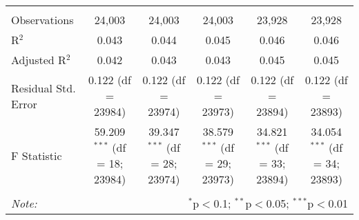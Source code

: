 \documentclass{article}
\begin{document}
\begin{table}[!htbp]
{\begin{tabular}{@{\extracolsep{5pt}}lccccc}
\hline \\[-1.8ex] 
Observations & 24,003 & 24,003 & 24,003 & 23,928 & 23,928 \\ 
R$^{2}$ & 0.043 & 0.044 & 0.045 & 0.046 & 0.046 \\ 
Adjusted R$^{2}$ & 0.042 & 0.043 & 0.043 & 0.045 & 0.045 \\ 
Residual Std. Error & 0.122 (df = 23984) & 0.122 (df = 23974) & 0.122 (df = 23973) & 0.122 (df = 23894) & 0.122 (df = 23893) \\ 
F Statistic & 59.209$^{***}$ (df = 18; 23984) & 39.347$^{***}$ (df = 28; 23974) & 38.579$^{***}$ (df = 29; 23973) & 34.821$^{***}$ (df = 33; 23894) & 34.054$^{***}$ (df = 34; 23893) \\ 
\hline 
\hline \\[-1.8ex] 
\textit{Note:}  & \multicolumn{5}{r}{$^{*}$p$<$0.1; $^{**}$p$<$0.05; $^{***}$p$<$0.01} \\ 
\end{tabular} }
\end{table} 
\end{document}

